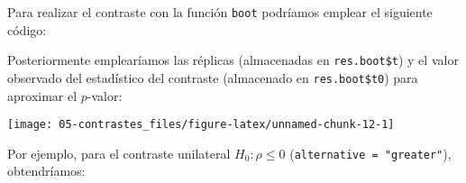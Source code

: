 \documentclass[
]{book}
\newenvironment{Shaded}{\begin{snugshade}}{\end{snugshade}}
\newcommand{\CommentTok}[1]{\textcolor[rgb]{0.56,0.35,0.01}{\textit{#1}}}
\newcommand{\ControlFlowTok}[1]{\textcolor[rgb]{0.13,0.29,0.53}{\textbf{#1}}}
\newcommand{\DataTypeTok}[1]{\textcolor[rgb]{0.13,0.29,0.53}{#1}}
\newcommand{\DecValTok}[1]{\textcolor[rgb]{0.00,0.00,0.81}{#1}}
\newcommand{\KeywordTok}[1]{\textcolor[rgb]{0.13,0.29,0.53}{\textbf{#1}}}
\newcommand{\NormalTok}[1]{#1}
\newcommand{\OperatorTok}[1]{\textcolor[rgb]{0.81,0.36,0.00}{\textbf{#1}}}
\newcommand{\OtherTok}[1]{\textcolor[rgb]{0.56,0.35,0.01}{#1}}
\newcommand{\StringTok}[1]{\textcolor[rgb]{0.31,0.60,0.02}{#1}}
\theoremstyle{break}
\theoremstyle{definition}
\theoremstyle{definition}
\theoremstyle{definition}
\theoremstyle{remark}
\begin{document}
Para realizar el contraste con la función \texttt{boot} podríamos
emplear el siguiente código:

\begin{Shaded}
\end{Shaded}

Posteriormente emplearíamos las réplicas (almacenadas en \texttt{res.boot\$t}) y el valor
observado del estadístico del contraste (almacenado en \texttt{res.boot\$t0})
para aproximar el \(p\)-valor:

\begin{Shaded}
\end{Shaded}

\begin{center}\texttt{[image: 05-contrastes\_files/figure-latex/unnamed-chunk-12-1]} \end{center}

Por ejemplo, para el contraste unilateral \(H_0: \rho \leq 0\)
(\texttt{alternative\ =\ "greater"}), obtendríamos:

\begin{Shaded}
\end{Shaded}
\end{document}

